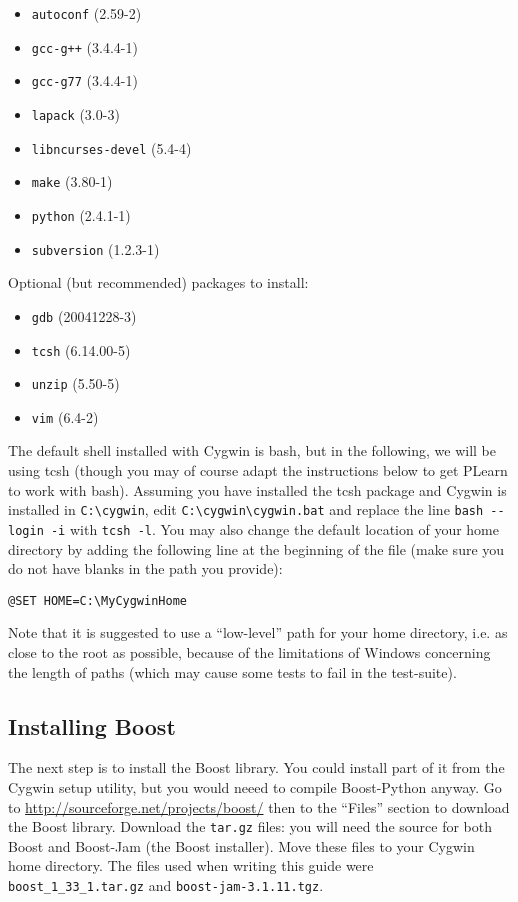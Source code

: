 \documentclass[11pt]{book}
\begin{document}
\begin{itemize}
\item \verb!autoconf! (2.59-2)
\item \verb!gcc-g++! (3.4.4-1)
\item \verb!gcc-g77! (3.4.4-1)
\item \verb!lapack! (3.0-3)
\item \verb!libncurses-devel! (5.4-4)
\item \verb!make! (3.80-1)
\item \verb!python! (2.4.1-1)
\item \verb!subversion! (1.2.3-1)
\end{itemize}

Optional (but recommended) packages to install:
\begin{itemize}
\item \verb!gdb! (20041228-3)
\item \verb!tcsh! (6.14.00-5)
\item \verb!unzip! (5.50-5)
\item \verb!vim! (6.4-2)
\end{itemize}

The default shell installed with Cygwin is bash, but in the following, we will
be using tcsh (though you may of course adapt the instructions below to get PLearn to
work with bash). Assuming you have installed the tcsh package and Cygwin is
installed in \verb!C:\cygwin!, edit \verb!C:\cygwin\cygwin.bat! and replace
the line \verb!bash --login -i! with \verb!tcsh -l!.
You may also change the default location of your home directory by adding the
following line at the beginning of the file (make sure you do not have blanks
in the path you provide):
\begin{verbatim}
@SET HOME=C:\MyCygwinHome
\end{verbatim}

Note that it is suggested to use a ``low-level'' path for your home directory, i.e. as close
to the root as possible, because of the limitations of Windows concerning the
length of paths (which may cause some tests to fail in the test-suite).

\subsection{Installing Boost}
The next step is to install the Boost library.
You could install part of it from the Cygwin setup utility, but you would
neeed to compile Boost-Python anyway.
Go to \url{http://sourceforge.net/projects/boost/} then to the ``Files'' section
to download
the Boost library. Download the \verb!tar.gz! files:
you will need the source for both Boost and Boost-Jam (the Boost installer).
Move these files to your Cygwin home directory.
The files used when writing this guide were \verb!boost_1_33_1.tar.gz!
and \verb!boost-jam-3.1.11.tgz!.
\end{document}
